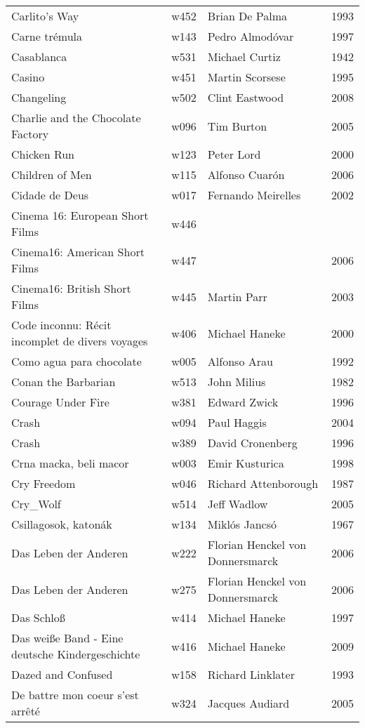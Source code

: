 \documentclass{article}
\begin{document}
\begin {center}
\begin{longtable}{p{10cm} l l l}
Carlito's Way & w452 & Brian De Palma & 1993 \\
Carne trémula & w143 & Pedro Almodóvar & 1997 \\
Casablanca & w531 & Michael Curtiz & 1942 \\
Casino & w451 & Martin Scorsese & 1995 \\
Changeling & w502 & Clint Eastwood & 2008 \\
Charlie and the Chocolate Factory & w096 & Tim Burton & 2005 \\
Chicken Run & w123 & Peter Lord & 2000 \\
Children of Men & w115 & Alfonso Cuarón & 2006 \\
Cidade de Deus & w017 & Fernando Meirelles & 2002 \\
Cinema 16: European Short Films & w446 &  &  \\
Cinema16: American Short Films & w447 &  & 2006 \\
Cinema16: British Short Films & w445 & Martin Parr & 2003 \\
Code inconnu: Récit incomplet de divers voyages & w406 & Michael Haneke & 2000 \\
Como agua para chocolate & w005 & Alfonso Arau & 1992 \\
Conan the Barbarian & w513 & John Milius & 1982 \\
Courage Under Fire & w381 & Edward Zwick & 1996 \\
Crash & w094 & Paul Haggis & 2004 \\
Crash & w389 & David Cronenberg & 1996 \\
Crna macka, beli macor & w003 & Emir Kusturica & 1998 \\
Cry Freedom & w046 & Richard Attenborough & 1987 \\
Cry\_Wolf & w514 & Jeff Wadlow & 2005 \\
Csillagosok, katonák & w134 & Miklós Jancsó & 1967 \\
Das Leben der Anderen & w222 & Florian Henckel von Donnersmarck & 2006 \\
Das Leben der Anderen & w275 & Florian Henckel von Donnersmarck & 2006 \\
Das Schloß & w414 & Michael Haneke & 1997 \\
Das weiße Band - Eine deutsche Kindergeschichte & w416 & Michael Haneke & 2009 \\
Dazed and Confused & w158 & Richard Linklater & 1993 \\
De battre mon coeur s'est arrêté & w324 & Jacques Audiard & 2005 \\

\end{longtable}
\end{center}
\end{document}

